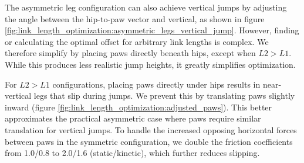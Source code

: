 The asymmetric leg configuration can also achieve vertical jumps by adjusting the angle between the hip-to-paw vector and vertical, as shown in figure \ref{fig:link_length_optimization:asymmetric_legs_vertical_jump}. However, finding or calculating the optimal offset for arbitrary link lengths is complex. We therefore simplify by placing paws directly beneath hips, except when $L2>L1$. While this produces less realistic jump heights, it greatly simplifies optimization.

For $L2>L1$ configurations, placing paws directly under hips results in near-vertical legs that slip during jumps. We prevent this by translating paws slightly inward (figure \ref{fig:link_length_optimization:adjusted_paws}). This better approximates the practical asymmetric case where paws require similar translation for vertical jumps. To handle the increased opposing horizontal forces between paws in the symmetric configuration, we double the friction coefficients from 1.0/0.8 to 2.0/1.6 (static/kinetic), which further reduces slipping.


